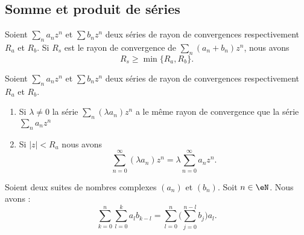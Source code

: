 \subsection{Somme et produit de séries}

\begin{theorem}\label{THOooSDQQooIawBOk}
	Soient \( \sum_na_nz^n\) et \( \sum b_nz^n\) deux séries de rayon de convergences respectivement \( R_a\) et \( R_b\).  Si \( R_s\) est le rayon de convergence de \( \sum_n(a_n+b_n)z^n\), nous avons
	\begin{equation}
		R_s\geq \min\{ R_a,R_b \}.
	\end{equation}
\end{theorem}

\begin{theorem}     \label{THOooINHDooZxErnp}
	Soient \( \sum_na_nz^n\) et \( \sum b_nz^n\) deux séries de rayon de convergences respectivement \( R_a\) et \( R_b\).
	\begin{enumerate}
		\item
		      Si \( \lambda\neq 0\) la série \( \sum_n(\lambda a_n)z^n\) a le même rayon de convergence que la série \( \sum_na_nz^n\)
		\item
		      Si \( | z |<R_a\) nous avons
		      \begin{equation}
			      \sum_{n=0}^{\infty}(\lambda a_n)z^n=\lambda\sum_{n=0}^{\infty}a_nz^n.
		      \end{equation}
	\end{enumerate}
\end{theorem}


\begin{lemma}       \label{LEMooNYAXooKUuQFe}
	Soient deux suites de nombres complexes \( (a_n)\) et \( (b_n)\). Soit \( n\in \eN\). Nous avons :
	\begin{equation}
		\sum_{k=0}^n\sum_{l=0}^ka_lb_{k-l}=\sum_{l=0}^n\big( \sum_{j=0}^{n-l}b_j \big)a_l.
	\end{equation}
\end{lemma}

